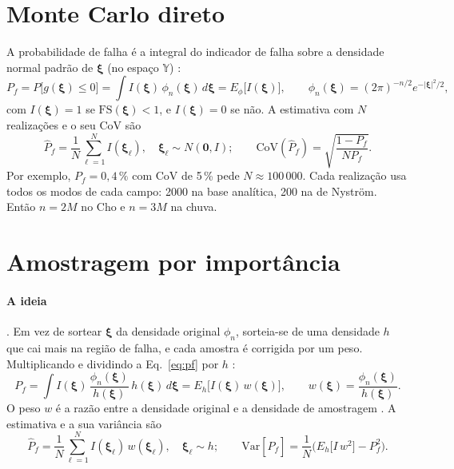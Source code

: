 \documentclass[11pt,a4paper]{article}
\newcommand{\Y}{\mathbb{Y}}
\newcommand{\xib}{\bm\xi}
\newcommand{\FS}{\mathrm{FS}}
\begin{document}
\section{Monte Carlo direto}\label{sec:mc}
A probabilidade de falha é a integral do indicador de falha sobre a densidade normal padrão de $\xib$ (no espaço $\Y$)
\citep[Eq.~6.4]{beck2014}:
\begin{equation}
  P_f = P\big[g(\xib) \le 0\big] = \int I(\xib)\,\phi_n(\xib)\,d\xib = E_\phi\big[I(\xib)\big], \qquad
  \phi_n(\xib) = (2\pi)^{-n/2}e^{-|\xib|^2/2},
  \label{eq:pf}
\end{equation}
com $I(\xib) = 1$ se $\FS(\xib) < 1$, e $I(\xib) = 0$ se não. A estimativa com $N$ realizações e o seu CoV são
\citep[Eqs.~6.5 a 6.7]{beck2014}
\begin{equation}
  \hat P_f = \frac{1}{N}\sum_{\ell=1}^{N} I(\xib_\ell), \quad \xib_\ell \sim N(\bm 0, I); \qquad
  \mathrm{CoV}(\hat P_f) = \sqrt{\frac{1 - P_f}{N P_f}}.
  \label{eq:mcdireto}
\end{equation}
Por exemplo, $P_f = 0{,}4\,\%$ com CoV de 5\,\% pede $N \approx 100\,000$. Cada realização usa todos os modos de cada
campo: 2000 na base analítica, 200 na de Nyström. Então $n = 2M$ no Cho e $n = 3M$ na chuva.

\section{Amostragem por importância}\label{sec:ai}
\paragraph{A ideia} \citep[Seç.~6.3.2]{beck2014}. Em vez de sortear $\xib$ da densidade original $\phi_n$, sorteia-se de
uma densidade $h$ que cai mais na região de falha, e cada amostra é corrigida por um peso. Multiplicando e dividindo a
Eq.~\eqref{eq:pf} por $h$ \citep[Eq.~6.23]{beck2014}:
\begin{equation}
  P_f = \int I(\xib)\,\frac{\phi_n(\xib)}{h(\xib)}\,h(\xib)\,d\xib = E_h\big[I(\xib)\,w(\xib)\big], \qquad
  w(\xib) = \frac{\phi_n(\xib)}{h(\xib)}.
  \label{eq:aiident}
\end{equation}
O peso $w$ é a razão entre a densidade original e a densidade de amostragem \citep[Eq.~6.25]{beck2014}. A estimativa e a
sua variância são \citep[Eqs.~6.24 e 6.27]{beck2014}
\begin{equation}
  \hat P_f = \frac{1}{N}\sum_{\ell=1}^{N} I(\xib_\ell)\,w(\xib_\ell), \quad \xib_\ell \sim h; \qquad
  \mathrm{Var}[\hat P_f] = \frac{1}{N}\Big(E_h\big[I\,w^2\big] - P_f^2\Big).
  \label{eq:aiest}
\end{equation}
\end{document}
